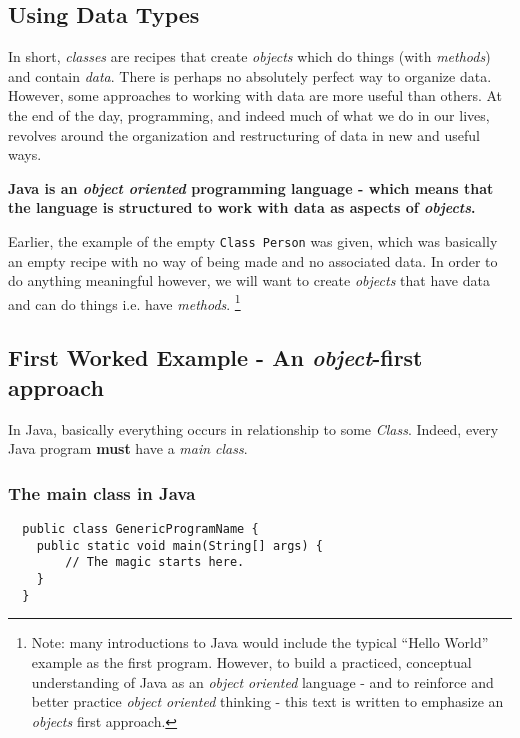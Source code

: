 \documentclass{article}
\begin{document}
\begin{flushleft}
\subsection{Using Data Types}
In short, \emph{classes} are recipes that create \emph{objects} which do things (with \emph{methods}) and contain \emph{data}. There is perhaps no absolutely perfect way to organize data. However, some approaches to working with data are more useful than others. At the end of the day, programming, and indeed much of what we do in our lives, revolves around the organization and restructuring of data in new and useful ways.\par
\begin{tcolorbox}[enhanced,width=5in,center upper,size=fbox,
    fontupper=\large\bfseries,drop shadow southwest,sharp corners]
\textbf{Java is an \emph{object oriented} programming language - which means that the language is structured to work with data as aspects of \emph{objects}.}
\end{tcolorbox}
Earlier, the example of the empty \texttt{Class Person} was given, which was basically an empty recipe with no way of being made and no associated data. In order to do anything meaningful however, we will want to create \emph{objects} that have data and can do things i.e. have \emph{methods}. \footnote{Note: many introductions to Java would include the typical ``Hello World'' example as the first program. However, to build a practiced, conceptual understanding of Java as an \emph{object oriented} language - and to reinforce and better practice \emph{object oriented} thinking - this text is written to emphasize an \emph{objects} first approach. }\par
\subsection{First Worked Example - An \emph{object}-first approach}

In Java, basically everything occurs in relationship to some \emph{Class}. Indeed, every Java program \textbf{must} have a \emph{main class}. 

\subsubsection{The \textbf{main} class in Java}
\label{code:main}
\begin{verbatim}
  public class GenericProgramName {
    public static void main(String[] args) {
        // The magic starts here.
    }  
  }
\end{verbatim}


\end{flushleft}
\end{document}

